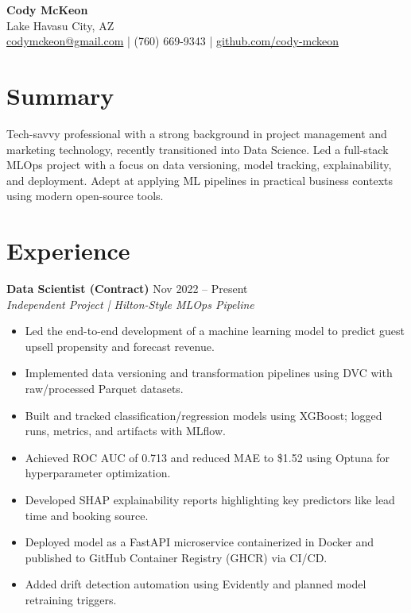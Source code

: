 \documentclass[a4paper,10pt]{article}
\begin{document}
\begin{center}
    {\LARGE \textbf{Cody McKeon}} \\
    \vspace{4pt}
    Lake Havasu City, AZ \\
    \href{mailto:codymckeon@gmail.com}{codymckeon@gmail.com} | (760) 669-9343 | \href{https://github.com/cody-mckeon}{github.com/cody-mckeon}
\end{center}

\vspace{8pt}

\section*{Summary}
Tech-savvy professional with a strong background in project management and marketing technology, recently transitioned into Data Science. Led a full-stack MLOps project with a focus on data versioning, model tracking, explainability, and deployment. Adept at applying ML pipelines in practical business contexts using modern open-source tools.

\section*{Experience}

\textbf{Data Scientist (Contract)} \hfill Nov 2022 -- Present \\
\textit{Independent Project | Hilton-Style MLOps Pipeline} \\
\begin{itemize}[leftmargin=*]
    \item Led the end-to-end development of a machine learning model to predict guest upsell propensity and forecast revenue.
    \item Implemented data versioning and transformation pipelines using DVC with raw/processed Parquet datasets.
    \item Built and tracked classification/regression models using XGBoost; logged runs, metrics, and artifacts with MLflow.
    \item Achieved ROC AUC of 0.713 and reduced MAE to \$1.52 using Optuna for hyperparameter optimization.
    \item Developed SHAP explainability reports highlighting key predictors like lead time and booking source.
    \item Deployed model as a FastAPI microservice containerized in Docker and published to GitHub Container Registry (GHCR) via CI/CD.
    \item Added drift detection automation using Evidently and planned model retraining triggers.
\end{itemize}
\end{document}
